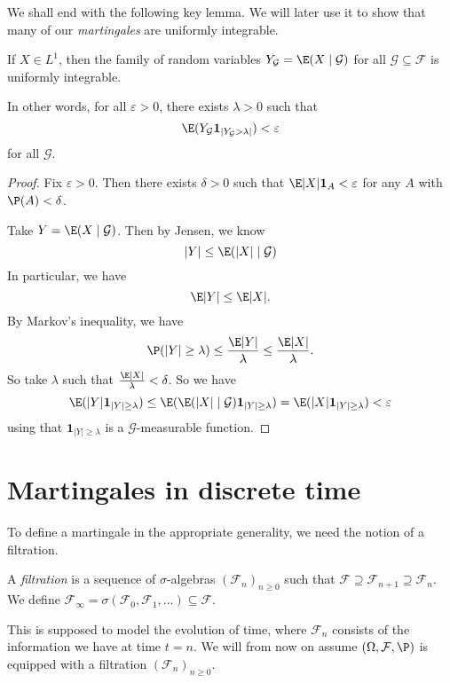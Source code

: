 \documentclass[a4paper]{article}
\begin{document}
We shall end with the following key lemma. We will later use it to show that many of our \emph{martingales} are uniformly integrable.
\begin{lemma}
  If $X \in L^1$, then the family of random variables $Y_{\mathcal{G}} = \E(X \mid \mathcal{G})$ for all $\mathcal{G} \subseteq \mathcal{F}$ is uniformly integrable.

  In other words, for all $\varepsilon > 0$, there exists $\lambda > 0$ such that
  \[
    \E(Y_{\mathcal{G}} \mathbf{1}_{|Y_{\mathcal{G}} > \lambda|}) < \varepsilon
  \]
  for all $\mathcal{G}$.
\end{lemma}

\begin{proof}
  Fix $\varepsilon > 0$. Then there exists $\delta > 0$ such that $\E |X|\mathbf{1}_A < \varepsilon$ for any $A$ with $\P(A) < \delta$.

  Take $Y = \E (X \mid \mathcal{G})$. Then by Jensen, we know
  \[
    |Y| \leq \E(|X| \mid \mathcal{G})
  \]
  In particular, we have
  \[
    \E|Y| \leq \E|X|.
  \]
  By Markov's inequality, we have
  \[
    \P(|Y| \geq \lambda) \leq \frac{\E|Y|}{\lambda} \leq \frac{\E|X|}{\lambda}.
  \]
  So take $\lambda$ such that $\frac{\E|X|}{\lambda} < \delta$. So we have
  \[
    \E(|Y| \mathbf{1}_{|Y| \geq \lambda}) \leq \E(\E(|X| \mid \mathcal{G})\mathbf{1}_{|Y| \geq \lambda}) = \E(|X| \mathbf{1}_{|Y| \geq \lambda}) < \varepsilon
  \]
  using that $\mathbf{1}_{|Y| \geq \lambda}$ is a $\mathcal{G}$-measurable function.
\end{proof}

\section{Martingales in discrete time}
To define a martingale in the appropriate generality, we need the notion of a filtration.
\begin{defi}[Filtration]
  A \emph{filtration} is a sequence of $\sigma$-algebras $(\mathcal{F}_n)_{n \geq 0}$ such that $\mathcal{F} \supseteq \mathcal{F}_{n + 1} \supseteq \mathcal{F}_n$. We define $\mathcal{F}_\infty = \sigma(\mathcal{F}_0, \mathcal{F}_1, \ldots) \subseteq \mathcal{F}$.
\end{defi}

This is supposed to model the evolution of time, where $\mathcal{F}_n$ consists of the information we have at time $t = n$. We will from now on assume $(\Omega, \mathcal{F}, \P)$ is equipped with a filtration $(\mathcal{F}_n)_{n \geq 0}$.
\end{document}
